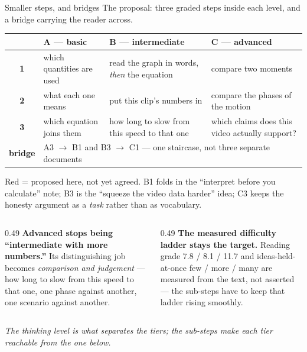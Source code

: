 \documentclass[aspectratio=169,10pt]{beamer}
\newcommand{\takeaway}[1]{\vfill{\footnotesize\itshape\color{cGrey}#1\par}}
\begin{document}
\begin{frame}{Smaller steps, and bridges}
\scriptsize
The proposal: three graded steps inside each level, and a bridge carrying the reader across.
\vspace{4pt}

\renewcommand{\arraystretch}{1.5}
\begin{tabular}{@{}clll@{}}
\toprule
& \textbf{\color{cBasic}A --- basic} & \textbf{\color{cInter}B --- intermediate} &
\textbf{\color{cAdv}C --- advanced} \\
\midrule
\textbf{1} & which quantities are used &
{\color{cAccent}read the graph in words,} \emph{then} the equation &
compare two moments \\
\textbf{2} & what each one means & put this clip's numbers in &
compare the phases of the motion \\
\textbf{3} & which equation joins them &
{\color{cAccent}how long to slow from this speed to that one} &
{\color{cAccent}which claims does this video actually support?} \\
\midrule
\textbf{bridge} & \multicolumn{3}{l}{A3 $\rightarrow$ B1 and B3 $\rightarrow$ C1 --- one staircase,
not three separate documents} \\
\bottomrule
\end{tabular}
\vspace{2pt}

{\scriptsize\color{cAccent}Red = proposed here, not yet agreed. B1 folds in the ``interpret before
you calculate'' note; B3 is the ``squeeze the video data harder'' idea; C3 keeps the honesty
argument as a \emph{task} rather than as vocabulary.}
\vspace{6pt}

\begin{columns}[T]
\begin{column}{0.49\textwidth}
\textbf{\color{cAdv}Advanced stops being ``intermediate with more numbers.''}
Its distinguishing job becomes \emph{comparison and judgement} --- how long to slow from this speed
to that one, one phase against another, one scenario against another.
\end{column}
\begin{column}{0.49\textwidth}
\textbf{\color{cApp}The measured difficulty ladder stays the target.}
Reading grade 7.8 / 8.1 / 11.7 and ideas-held-at-once few / more / many are measured from the text,
not asserted --- the sub-steps have to keep that ladder rising smoothly.
\end{column}
\end{columns}
\takeaway{The thinking level is what separates the tiers; the sub-steps make each tier reachable
from the one below.}
\end{frame}
\end{document}
